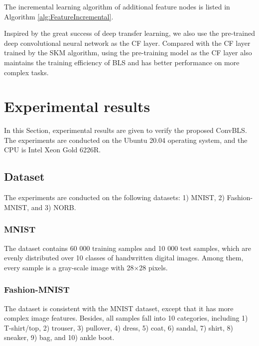 \documentclass[lettersize,journal]{IEEEtran}
\begin{document}
The incremental learning algorithm of additional feature nodes is listed in Algorithm \ref{alg:FeatureIncremental}.

Inspired by the great success of deep transfer learning, we also use the pre-trained deep convolutional neural network as the CF layer. Compared with the CF layer trained by the SKM algorithm, using the pre-training model as the CF layer also maintains the training efficiency of BLS and has better performance on more complex tasks.

\section{Experimental results}
In this Section, experimental results are given to verify the proposed ConvBLS. The experiments are conducted on the Ubuntu 20.04 operating system, and the CPU is Intel Xeon Gold 6226R.

\subsection{Dataset}
The experiments are conducted on the following datasets: 1) MNIST, 2) Fashion-MNIST, and 3) NORB.
\subsubsection{MNIST}
The dataset\cite{lecun1998gradient} contains 60 000 training samples and 10 000 test samples, which are evenly distributed over 10 classes of handwritten digital images. Among them, every sample is a gray-scale image with 28$\times$28 pixels.

\subsubsection{Fashion-MNIST}
The dataset\cite{xiao2017fashion} is consistent with the MNIST dataset, except that it has more complex image features. Besides, all samples fall into 10 categories, including 1) T-shirt/top, 2) trouser, 3) pullover, 4) dress, 5) coat, 6) sandal, 7) shirt, 8) sneaker, 9) bag, and 10) ankle boot.
\end{document}
